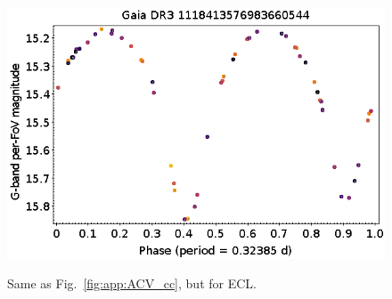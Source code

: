 \documentclass[longauth]{aa}
\begin{document}
\begin{appendix}
\begin{figure}
\hspace{2mm}
 \includegraphics[width=0.45\hsize]{figures/appendix/ECL-35.png} \\
\vspace{4mm}
 \caption{Same as Fig.~\ref{fig:app:ACV_cc}, but for ECL.}
 \label{fig:app:ECL_cc}
\end{figure}




\end{appendix}
\end{document}
